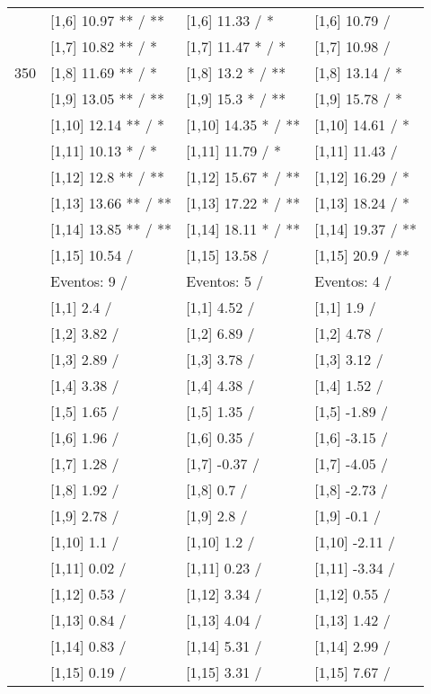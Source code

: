 \begin{table}
\begin{tabular}[t]{llll}
 & {}[1,6] 10.97 ** / ** & {}[1,6] 11.33  / * & {}[1,6] 10.79  /\\
 & {}[1,7] 10.82 ** / * & {}[1,7] 11.47 * / * & {}[1,7] 10.98  /\\
350 & {}[1,8] 11.69 ** / * & {}[1,8] 13.2 * / ** & {}[1,8] 13.14  / *\\
\addlinespace
 & {}[1,9] 13.05 ** / ** & {}[1,9] 15.3 * / ** & {}[1,9] 15.78  / *\\
 & {}[1,10] 12.14 ** / * & {}[1,10] 14.35 * / ** & {}[1,10] 14.61  / *\\
 & {}[1,11] 10.13 * / * & {}[1,11] 11.79  / * & {}[1,11] 11.43  /\\
 & {}[1,12] 12.8 ** / ** & {}[1,12] 15.67 * / ** & {}[1,12] 16.29  / *\\
 & {}[1,13] 13.66 ** / ** & {}[1,13] 17.22 * / ** & {}[1,13] 18.24  / *\\
\addlinespace
 & {}[1,14] 13.85 ** / ** & {}[1,14] 18.11 * / ** & {}[1,14] 19.37  / **\\
 & {}[1,15] 10.54  / & {}[1,15] 13.58  / & {}[1,15] 20.9  / **\\
 & Eventos:  9 / & Eventos:  5 / & Eventos:  4 /\\
 & {}[1,1] 2.4  / & {}[1,1] 4.52  / & {}[1,1] 1.9  /\\
 & {}[1,2] 3.82  / & {}[1,2] 6.89  / & {}[1,2] 4.78  /\\
\addlinespace
 & {}[1,3] 2.89  / & {}[1,3] 3.78  / & {}[1,3] 3.12  /\\
 & {}[1,4] 3.38  / & {}[1,4] 4.38  / & {}[1,4] 1.52  /\\
 & {}[1,5] 1.65  / & {}[1,5] 1.35  / & {}[1,5] -1.89  /\\
 & {}[1,6] 1.96  / & {}[1,6] 0.35  / & {}[1,6] -3.15  /\\
 & {}[1,7] 1.28  / & {}[1,7] -0.37  / & {}[1,7] -4.05  /\\
\addlinespace
500 & {}[1,8] 1.92  / & {}[1,8] 0.7  / & {}[1,8] -2.73  /\\
 & {}[1,9] 2.78  / & {}[1,9] 2.8  / & {}[1,9] -0.1  /\\
 & {}[1,10] 1.1  / & {}[1,10] 1.2  / & {}[1,10] -2.11  /\\
 & {}[1,11] 0.02  / & {}[1,11] 0.23  / & {}[1,11] -3.34  /\\
 & {}[1,12] 0.53  / & {}[1,12] 3.34  / & {}[1,12] 0.55  /\\
\addlinespace
 & {}[1,13] 0.84  / & {}[1,13] 4.04  / & {}[1,13] 1.42  /\\
 & {}[1,14] 0.83  / & {}[1,14] 5.31  / & {}[1,14] 2.99  /\\
 & {}[1,15] 0.19  / & {}[1,15] 3.31  / & {}[1,15] 7.67  /\\
\bottomrule
\end{tabular}
\end{table}
